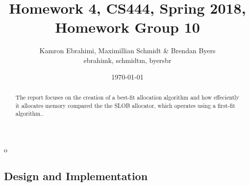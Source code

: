 \documentclass[10pt,onecolumn,draftclsnofoot]{IEEEtran} %
\title{ Homework 4, CS444, Spring 2018, Homework Group 10}
\author{Kamron Ebrahimi, Maximillian Schmidt \& Brendan Byers \\ ebrahimk, schmidtm, byersbr }
\date{\today}
\begin{document}
\begin{titlingpage}
\maketitle
\begin{abstract}
\begin{singlespace}
The report focuses on the creation of a best-fit allocation algorithm and how effeciently it allocates memory compared the the SLOB allocator, which operates using a first-fit algorithm.. 
\end{singlespace}
\end{abstract}
\end{titlingpage}


\tableofcontents

\newpage
o\begin{singlespace}
\section{\bf  Design and Implementation}


\end{singlespace}
\end{document}
